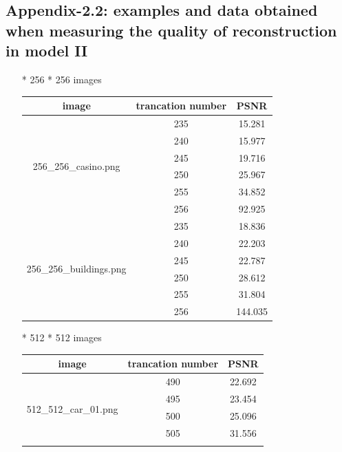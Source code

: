 \subsection{Appendix-2.2: examples and data obtained when measuring the quality of reconstruction in model II}
\begin{enumerate}
\item[*] 256 * 256 images
\begin{table}[H]
    \centering
    \begin{tabular}{|c|c|c|}
        \hline
        \textbf{image} & \textbf{trancation number} & \textbf{PSNR} \\
        \hline
        \multirow{6}{*}{256_256_casino.png} & 235 & 15.281 \\
        \cline{2-3}
        & 240 & 15.977 \\
        \cline{2-3}
        & 245 & 19.716 \\
        \cline{2-3}
        & 250 & 25.967 \\
        \cline{2-3}
        & 255 & 34.852 \\
        \cline{2-3}
        & 256 & 92.925 \\
        \hline
        \multirow{6}{*}{256_256_buildings.png} & 235 & 18.836 \\
        \cline{2-3}
        & 240 & 22.203 \\
        \cline{2-3}
        & 245 & 22.787 \\
        \cline{2-3}
        & 250 & 28.612 \\
        \cline{2-3}
        & 255 & 31.804 \\
        \cline{2-3}
        & 256 & 144.035 \\
        \hline
    \end{tabular}
\end{table}
\item[*] 512 * 512 images
\begin{table}[H]
    \centering
    \begin{tabular}{|c|c|c|}
        \hline
        \textbf{image} & \textbf{trancation number} & \textbf{PSNR} \\
        \hline
        \multirow{6}{*}{512_512_car_01.png} & 490 & 22.692 \\
        \cline{2-3}
        & 495 & 23.454 \\
        \cline{2-3}
        & 500 & 25.096 \\
        \cline{2-3}
        & 505 & 31.556 \\
        \cline{2-3}

\end{tabular}
\end{table}
\end{enumerate}
